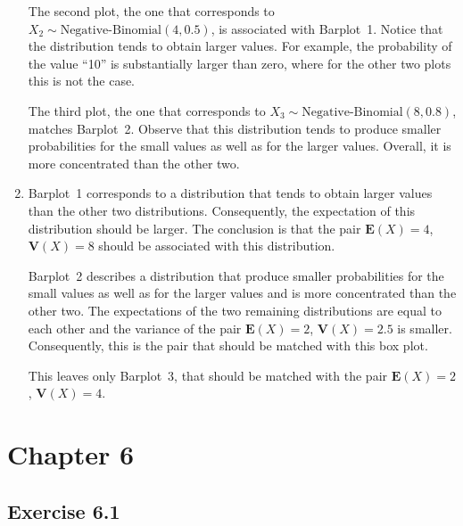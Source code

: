 \documentclass[]{krantz}
\newcommand{\Expec}{\mathbf{E}}
\newcommand{\Var}{\mathbf{V}}
\theoremstyle{definition}
\theoremstyle{definition}
\theoremstyle{definition}
\theoremstyle{remark}
\begin{document}
\begin{enumerate}
  The second plot, the one that corresponds to
  \(X_2 \sim \mbox{Negative-Binomial}(4,0.5)\), is associated with
  Barplot~1. Notice that the distribution tends to obtain larger values.
  For example, the probability of the value ``10'' is substantially larger
  than zero, where for the other two plots this is not the case.

  The third plot, the one that corresponds to
  \(X_3 \sim \mbox{Negative-Binomial}(8,0.8)\), matches Barplot~2. Observe
  that this distribution tends to produce smaller probabilities for the
  small values as well as for the larger values. Overall, it is more
  concentrated than the other two.
\item
  Barplot~1 corresponds to a
  distribution that tends to obtain larger values than the other two
  distributions. Consequently, the expectation of this distribution should
  be larger. The conclusion is that the pair \(\Expec(X) = 4\),
  \(\Var(X) = 8\) should be associated with this distribution.

  Barplot~2 describes a distribution that produce smaller probabilities
  for the small values as well as for the larger values and is more
  concentrated than the other two. The expectations of the two remaining
  distributions are equal to each other and the variance of the pair
  \(\Expec(X) = 2\), \(\Var(X) = 2.5\) is smaller. Consequently, this is the
  pair that should be matched with this box plot.

  This leaves only Barplot~3, that should be matched with the pair
  \(\Expec(X) = 2\), \(\Var(X) = 4\).
\end{enumerate}

\hypertarget{chapter-6}{%
\section*{Chapter 6}\label{chapter-6}}


\hypertarget{exercise-6.1}{%
\subsection*{Exercise 6.1}\label{exercise-6.1}}
\end{document}
